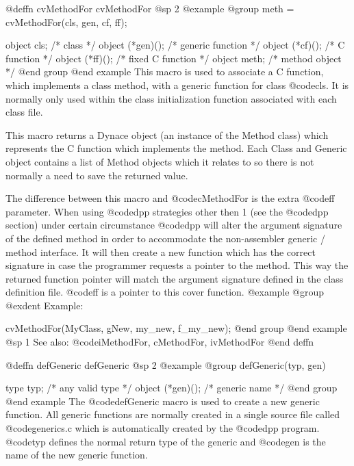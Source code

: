 {{{{@deffn {cvMethodFor} cvMethodFor
@sp 2
@example
@group
meth = cvMethodFor(cls, gen, cf, ff);

object  cls;            /*  class               */
object  (*gen)();       /*  generic function    */
object  (*cf)();        /*  C function          */
object  (*ff)();        /*  fixed C function    */
object  meth;           /*  method object       */
@end group
@end example
This macro is used to associate a C function, which implements a
class method, with a generic function for class @code{cls}.  It is
normally only used within the class initialization function associated
with each class file.

This macro returns a Dynace object (an instance of the Method class) which
represents the C function which implements the method.  Each Class 
and Generic object contains a list of Method objects which it relates
to so there is not normally a need to save the returned value.

The difference between this macro and @code{cMethodFor} is the extra @code{ff}
parameter.  When using @code{dpp} strategies other then 1 (see the @code{dpp}
section) under certain circumstance @code{dpp} will alter the argument
signature of the defined method in order to accommodate the non-assembler
generic / method interface.  It will then create a new function which has
the correct signature in case the programmer requests a pointer to the
method.  This way the returned function pointer will match the argument
signature defined in the class definition file.  @code{ff} is a pointer
to this cover function.
@example
@group
@exdent Example:

cvMethodFor(MyClass, gNew, my_new, f_my_new);
@end group
@end example
@sp 1
See also:  @code{iMethodFor, cMethodFor, ivMethodFor}
@end deffn

















@deffn {defGeneric} defGeneric
@sp 2
@example
@group
defGeneric(typ, gen)

type    typ;       /*  any valid type  */
object  (*gen)();  /*  generic name    */
@end group
@end example
The @code{defGeneric} macro is used to create a new generic function.
All generic functions are normally created in a single source file
called @code{generics.c} which is automatically created by the
@code{dpp} program.  @code{typ} defines the normal return type
of the generic and @code{gen} is the name of the new generic function.

}}}}
